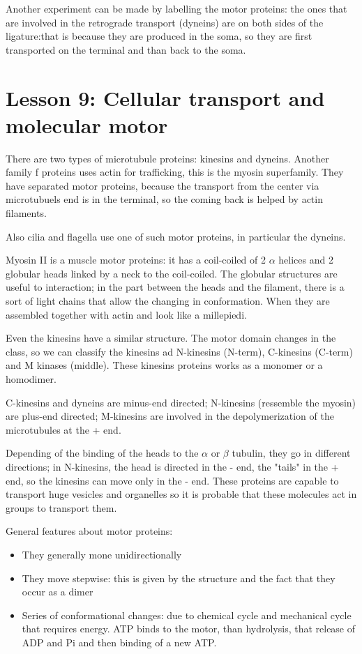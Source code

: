 \documentclass[a4paper, 12pt]{book}
\begin{document}
Another experiment can be made by labelling the motor proteins: the ones that are involved in the retrograde transport (dyneins) are on both sides of the ligature:that is because they are produced in the soma, so they are first transported on the terminal and than back to the soma.


\chapter{Lesson 9: Cellular transport and molecular motor}
There are two types of microtubule proteins: kinesins and dyneins. Another family f proteins uses actin for trafficking, this is the myosin superfamily. They have separated motor proteins, because the transport from the center via microtubuels end is in the terminal, so the coming back is helped by actin filaments.

Also cilia and flagella use one of such motor proteins, in particular the dyneins. 

Myosin II is a muscle motor proteins: it has a coil-coiled of 2 $\alpha$ helices and 2 globular heads linked by a neck to the coil-coiled. The globular structures are useful to interaction; in the part between the heads and the filament, there is a sort of light chains that allow the changing in conformation. When they are assembled together with actin and look like a millepiedi.

Even the kinesins have a similar structure. The motor domain changes in the class, so we can classify the kinesins ad N-kinesins (N-term), C-kinesins (C-term) and M kinases (middle). These kinesins proteins works as a monomer or a homodimer. 

C-kinesins and dyneins are minus-end directed; N-kinesins (ressemble the myosin) are plus-end directed; M-kinesins are involved in the depolymerization of the microtubules at the + end.

Depending of the binding of the heads to the $\alpha$ or $\beta$ tubulin, they go in different directions; in N-kinesins, the head is directed in the - end, the "tails" in the + end, so the kinesins can move only in the - end. These proteins are capable to transport huge vesicles and organelles so it is probable that these molecules act in groups to transport them.

General features about motor proteins:
\begin{itemize}
\item{They generally mone unidirectionally}
\item{They move stepwise: this is given by the structure and the fact that they occur as a dimer}
\item{Series of conformational changes: due to chemical cycle and mechanical cycle that requires energy. ATP binds to the motor, than hydrolysis, that release of ADP and Pi and then binding of a new ATP.}
\end{itemize}
\end{document}
